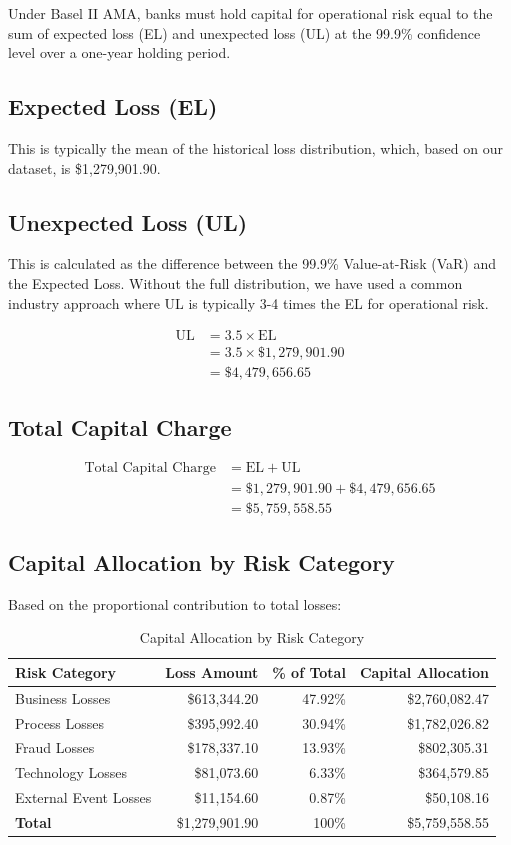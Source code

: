 Under Basel II AMA, banks must hold capital for operational risk equal to the sum of expected loss (EL) and unexpected loss (UL) at the 99.9\% confidence level over a one-year holding period.

\subsection{Expected Loss (EL)}
This is typically the mean of the historical loss distribution, which, based on our dataset, is \$1,279,901.90.

\subsection{Unexpected Loss (UL)}
This is calculated as the difference between the 99.9\% Value-at-Risk (VaR) and the Expected Loss. Without the full distribution, we have used a common industry approach where UL is typically 3-4 times the EL for operational risk.

\begin{align}
\text{UL} &= 3.5 \times \text{EL} \\
&= 3.5 \times \$1,279,901.90 \\
&= \$4,479,656.65
\end{align}

\subsection{Total Capital Charge}
\begin{align}
\text{Total Capital Charge} &= \text{EL} + \text{UL} \\
&= \$1,279,901.90 + \$4,479,656.65 \\
&= \$5,759,558.55
\end{align}

\newpage
\subsection{Capital Allocation by Risk Category}
Based on the proportional contribution to total losses:

\begin{table}[htbp]
  \centering
  
  \begin{tabular}{lrrr}
    \hline
    \textbf{Risk Category} & \textbf{Loss Amount} & \textbf{\% of Total} & \textbf{Capital Allocation} \\
    \hline
    Business Losses & \$613,344.20 & 47.92\% & \$2,760,082.47 \\
    Process Losses & \$395,992.40 & 30.94\% & \$1,782,026.82 \\
    Fraud Losses & \$178,337.10 & 13.93\% & \$802,305.31 \\
    Technology Losses & \$81,073.60 & 6.33\% & \$364,579.85 \\
    External Event Losses & \$11,154.60 & 0.87\% & \$50,108.16 \\
    \hline
    \textbf{Total} & \$1,279,901.90 & 100\% & \$5,759,558.55 \\
    \hline
  \end{tabular}
    \caption{Capital Allocation by Risk Category}
\end{table}

